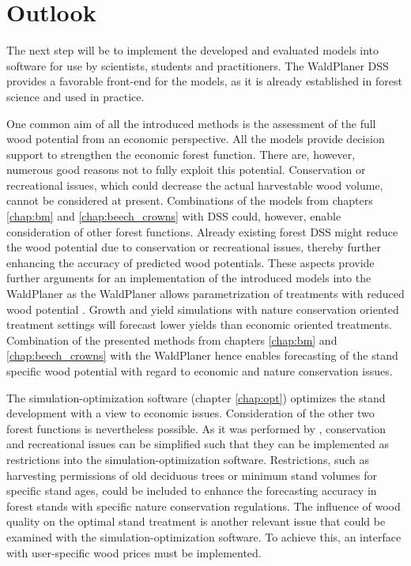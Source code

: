 \section{Outlook}
\label{sec:discussion:outlook}
The next step will be to implement the developed and evaluated models into software for use by scientists, students and practitioners. The WaldPlaner DSS provides a favorable front-end for the models, as it is already established in forest science and used in practice.

One common aim of all the introduced methods is the assessment of the full wood potential from an economic perspective. All the models provide decision support to strengthen the economic forest function. There are, however, numerous good reasons not to fully exploit this potential. Conservation or recreational issues, which could decrease the actual harvestable wood volume, cannot be considered at present. Combinations of the models from chapters \ref{chap:bm} and \ref{chap:beech_crowns} with DSS could, however, enable consideration of other forest functions. Already existing forest DSS might reduce the wood potential due to conservation or recreational issues, thereby further enhancing the accuracy of predicted wood potentials. These aspects provide further arguments for an implementation of the introduced models into the WaldPlaner as the WaldPlaner allows parametrization of treatments with reduced wood potential \citep[p. 90-93]{hansen_2014}. Growth and yield simulations with nature conservation oriented treatment settings will forecast lower yields than economic oriented treatments. Combination of the presented methods from chapters \ref{chap:bm} and \ref{chap:beech_crowns} with the WaldPlaner hence enables forecasting of the stand specific wood potential with regard to economic and nature conservation issues.

The si\-mu\-la\-tion-op\-ti\-mi\-za\-tion software (chapter \ref{chap:opt}) optimizes the stand development with a view to economic issues. Consideration of the other two forest functions is nevertheless possible. As it was performed by \citet{yousefpour_2009}, conservation and recreational issues can be simplified such that they can be implemented as restrictions into the si\-mu\-la\-tion-op\-ti\-mi\-za\-tion software. Restrictions, such as harvesting permissions of old deciduous trees or minimum stand volumes for specific stand ages, could be included to enhance the forecasting accuracy in forest stands with specific nature conservation regulations. The influence of wood quality on the optimal stand treatment is another relevant issue that could be examined with the si\-mu\-la\-tion-op\-ti\-mi\-za\-tion software. To achieve this, an interface with user-specific wood prices must be implemented.

